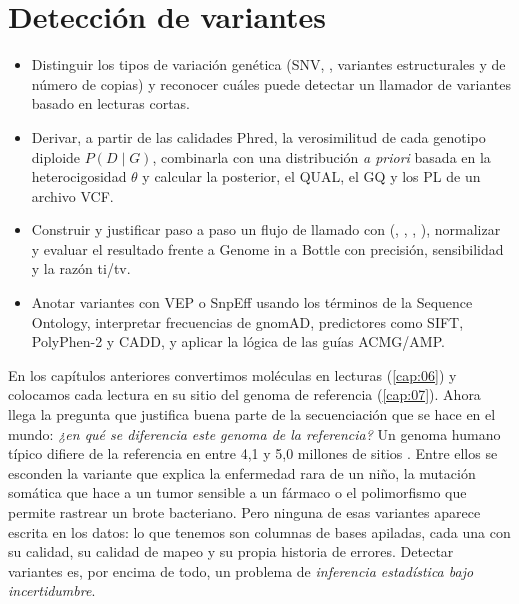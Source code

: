 \chapter{Detección de variantes}\label{cap:09}



\begin{objetivos}
\begin{itemize}
  \item Distinguir los tipos de variación genética (SNV, , variantes estructurales y de número de copias) y reconocer cuáles puede detectar un llamador de variantes basado en lecturas cortas.
  \item Derivar, a partir de las calidades Phred, la verosimilitud de cada genotipo diploide $P(D\mid G)$, combinarla con una distribución \emph{a priori} basada en la heterocigosidad $\theta$ y calcular la posterior, el QUAL, el GQ y los PL de un archivo VCF.
  \item Construir y justificar paso a paso un flujo de llamado con  (, , , ), normalizar  y evaluar el resultado frente a Genome in a Bottle con precisión, sensibilidad y la razón ti/tv.
  \item Anotar variantes con VEP o SnpEff usando los términos de la Sequence Ontology, interpretar frecuencias de gnomAD, predictores como SIFT, PolyPhen-2 y CADD, y aplicar la lógica de las guías ACMG/AMP.
\end{itemize}
\end{objetivos}

En los capítulos anteriores convertimos moléculas en lecturas (\cref{cap:06}) y colocamos cada lectura en su sitio del genoma de referencia (\cref{cap:07}). Ahora llega la pregunta que justifica buena parte de la secuenciación que se hace en el mundo: \emph{¿en qué se diferencia este genoma de la referencia?} Un genoma humano típico difiere de la referencia en entre 4,1 y 5,0 millones de sitios \parencite{c09-auton2015}. Entre ellos se esconden la variante que explica la enfermedad rara de un niño, la mutación somática que hace a un tumor sensible a un fármaco o el polimorfismo que permite rastrear un brote bacteriano. Pero ninguna de esas variantes aparece escrita en los datos: lo que tenemos son columnas de bases apiladas, cada una con su calidad, su calidad de mapeo y su propia historia de errores. Detectar variantes es, por encima de todo, un problema de \emph{inferencia estadística bajo incertidumbre}.


